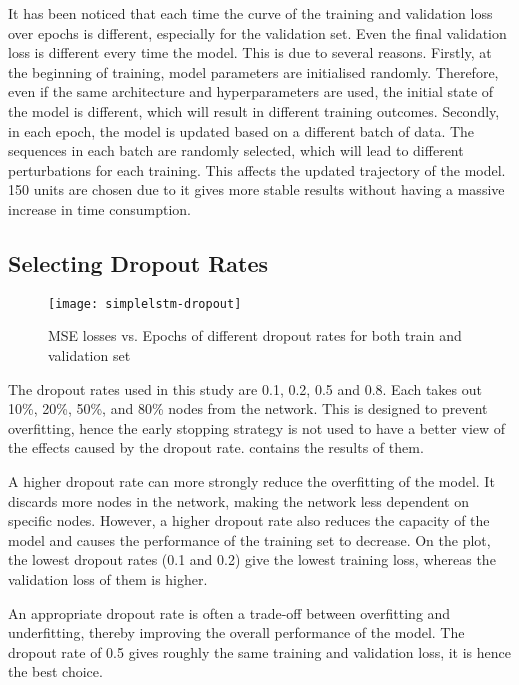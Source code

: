 It has been noticed that each time the curve of the training and validation loss over epochs is different, especially for the validation set. Even the final validation loss is different every time the model. 
This is due to several reasons. Firstly, at the beginning of training, model parameters are initialised randomly. Therefore, even if the same architecture and hyperparameters are used, the initial state of the model is different, which will result in different training outcomes. 
Secondly, in each epoch, the model is updated based on a different batch of data. The sequences in each batch are randomly selected, which will lead to different perturbations for each training. This affects the updated trajectory of the model.
150 units are chosen due to it gives more stable results without having a massive increase in time consumption.

\subsection{Selecting Dropout Rates}

\begin{figure}[!htb]
    \centering
    \texttt{[image: simplelstm-dropout]}
    \caption{MSE losses vs. Epochs of different dropout rates for both train and validation set}
    \label{Figure:simplelstm-dropout}
\end{figure}

The dropout rates used in this study are 0.1, 0.2, 0.5 and 0.8. Each takes out 10\%, 20\%, 50\%, and 80\% nodes from the network. 
This is designed to prevent overfitting, hence the early stopping strategy is not used to have a better view of the effects caused by the dropout rate.
 contains the results of them.

A higher dropout rate can more strongly reduce the overfitting of the model. It discards more nodes in the network, making the network less dependent on specific nodes.
However, a higher dropout rate also reduces the capacity of the model and causes the performance of the training set to decrease. 
On the plot, the lowest dropout rates (0.1 and 0.2) give the lowest training loss, whereas the validation loss of them is higher. 

An appropriate dropout rate is often a trade-off between overfitting and underfitting, thereby improving the overall performance of the model. 
The dropout rate of 0.5 gives roughly the same training and validation loss, it is hence the best choice.

